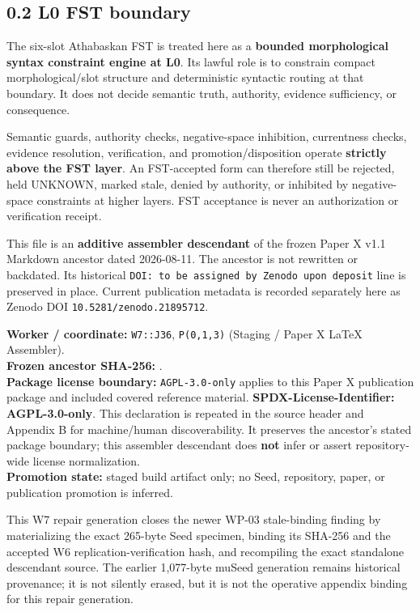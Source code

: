 \documentclass[
  10pt,
  letterpaper,
]{article}
\begin{document}
\subsection{0.2 L0 FST boundary}

The six-slot Athabaskan FST is treated here as a \textbf{bounded morphological
syntax constraint engine at L0}. Its lawful role is to constrain compact
morphological/slot structure and deterministic syntactic routing at that
boundary. It does not decide semantic truth, authority, evidence sufficiency,
or consequence.

Semantic guards, authority checks, negative-space inhibition, currentness
checks, evidence resolution, verification, and promotion/disposition operate
\textbf{strictly above the FST layer}. An FST-accepted form can therefore still
be rejected, held UNKNOWN, marked stale, denied by authority, or inhibited by
negative-space constraints at higher layers. FST acceptance is never an
authorization or verification receipt.

This file is an \textbf{additive assembler descendant} of the frozen
Paper X v1.1 Markdown ancestor dated 2026-08-11. The ancestor is not
rewritten or backdated. Its historical \texttt{DOI: to be assigned by Zenodo upon deposit} line is
preserved in place. Current publication metadata is recorded separately
here as Zenodo DOI \nolinkurl{10.5281/zenodo.21895712}.

\textbf{Worker / coordinate:} \nolinkurl{W7::J36}, \nolinkurl{P(0,1,3)}
(Staging / Paper X LaTeX Assembler).\\
\textbf{Frozen ancestor SHA-256:}
\texttt{}.\\
\textbf{Package license boundary:} \nolinkurl{AGPL-3.0-only} applies to
this Paper X publication package and included covered reference material.
\textbf{SPDX-License-Identifier: AGPL-3.0-only}. This declaration is repeated
in the source header and Appendix B for machine/human discoverability. It
preserves the ancestor's stated package boundary; this assembler descendant does \textbf{not}
infer or assert repository-wide license normalization.\\
\textbf{Promotion state:} staged build artifact only; no Seed,
repository, paper, or publication promotion is inferred.

This W7 repair generation closes the newer WP-03 stale-binding finding by
materializing the exact 265-byte Seed specimen, binding its SHA-256 and
the accepted W6 replication-verification hash, and recompiling the exact
standalone descendant source. The earlier 1,077-byte muSeed generation
remains historical provenance; it is not silently erased, but it is not
the operative appendix binding for this repair generation.
\end{document}
